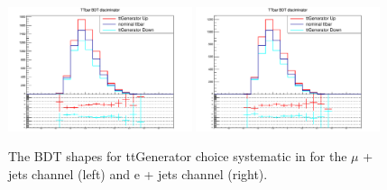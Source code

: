 


\begin{figure}[ht!]
    \includegraphics[width=0.48\textwidth]{images/Run2/Sys/ttGeneratorsystt.pdf}
    \includegraphics[width=0.48\textwidth]{images/Run2/Sys/ttGeneratorsystt_e.pdf}     
    \caption{The BDT shapes for ttGenerator choice systematic in \ttbar for the $\mu$ + jets channel (left) and e + jets channel (right).}
    \label{fig:SysShapesttGen}
\end{figure}
